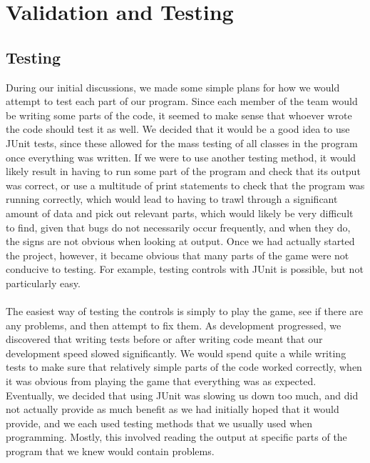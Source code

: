 \chapter{Validation and Testing}
\label{cha:validation}
\section{Testing}
During our initial discussions, we made some simple plans for how we would attempt to test each part of our program. Since each member of the team would be writing some parts of the code, it seemed to make sense that whoever wrote the code should test it as well. We decided that it would be a good idea to use JUnit tests, since these allowed for the mass testing of all classes in the program once everything was written. If we were to use another testing method, it would likely result in having to run some part of the program and check that its output was correct, or use a multitude of print statements to check that the program was running correctly, which would lead to having to trawl through a significant amount of data and pick out relevant parts, which would likely be very difficult to find, given that bugs do not necessarily occur frequently, and when they do, the signs are not obvious when looking at output. Once we had actually started the project, however, it became obvious that many parts of the game were not conducive to testing. For example, testing controls with JUnit is possible, but not particularly easy.\\\\
The easiest way of testing the controls is simply to play the game, see if there are any problems, and then attempt to fix them. As development progressed, we discovered that writing tests before or after writing code meant that our development speed slowed significantly. We would spend quite a while writing tests to make sure that relatively simple parts of the code worked correctly, when it was obvious from playing the game that everything was as expected. Eventually, we decided that using JUnit was slowing us down too much, and did not actually provide as much benefit as we had initially hoped that it would provide, and we each used testing methods that we usually used when programming. Mostly, this involved reading the output at specific parts of the program that we knew would contain problems.\\\\
